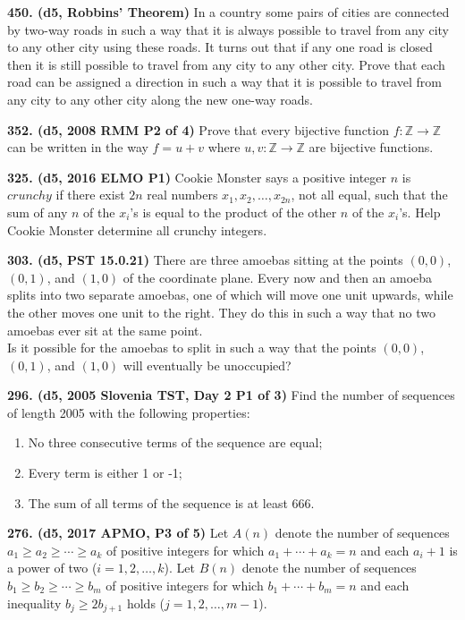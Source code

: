 \documentclass{article}
\begin{document}
        \textbf{450. (\color{red}d5\color{black}, Robbins' Theorem)} In a country some pairs of cities are connected by two-way roads in such a way that it is always possible to travel from any city to any other city using these roads. It turns out that if any one road is closed then it is still possible to travel from any city to any other city. Prove that each road can be assigned a direction in such a way that it is possible to travel from any city to any other city along the new one-way roads.

        \textbf{352. (\color{red}d5\color{black}, 2008 RMM P2 of 4)} Prove that every bijective function $ f: \mathbb{Z}\rightarrow\mathbb{Z}$ can be written in the way $ f=u+v$ where $ u,v: \mathbb{Z}\rightarrow\mathbb{Z}$ are bijective functions.

        \textbf{325. (\color{red}d5\color{black}, 2016 ELMO P1)} Cookie Monster says a positive integer $n$ is $crunchy$ if there exist $2n$ real numbers $x_1,x_2,\ldots,x_{2n}$, not all equal, such that the sum of any $n$ of the $x_i$'s is equal to the product of the other $n$ of the $x_i$'s. Help Cookie Monster determine all crunchy integers.

        \textbf{303. (\color{red}d5\color{black}, PST 15.0.21)} There are three amoebas sitting at the points \((0,0)\), \((0,1)\), and \((1,0)\) of the coordinate plane. Every now and then an amoeba splits into two separate amoebas, one of which will move one unit upwards, while the other moves one unit to the right. They do this in such a way that no two amoebas ever sit at the same point.\\

        \makebox[1.5em]{}Is it possible for the amoebas to split in such a way that the points \((0,0)\), \((0,1)\), and \((1,0)\) will eventually be unoccupied?

        \textbf{296. (\color{red}d5\color{black}, 2005 Slovenia TST, Day 2 P1 of 3)} Find the number of sequences of length 2005 with the following properties:
        \begin{enumerate}
                \item{No three consecutive terms of the sequence are equal;}
                \item{Every term is either 1 or -1;}
                \item{The sum of all terms of the sequence is at least 666.}
        \end{enumerate}

        \textbf{276. (\color{red}d5\color{black}, 2017 APMO, P3 of 5)} Let \(A(n)\) denote the number of sequences \(a_1 \geq a_2 \geq \cdots \geq a_k\) of positive integers for which \(a_1 + \cdots + a_k = n\) and each \(a_i + 1\) is a power of two (\(i = 1, 2, \dots , k\)). Let \(B(n)\) denote the number of sequences \(b_1 \geq b_2 \geq \cdots \geq b_m\) of positive integers for which \(b_1 + \cdots + b_m = n\) and each inequality \(b_j \geq 2b_{j+1}\) holds (\(j = 1, 2, \dots, m - 1\)).
\end{document}
